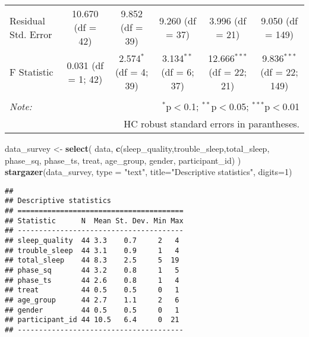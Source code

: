 \documentclass[
]{article}
\newenvironment{Shaded}{\begin{snugshade}}{\end{snugshade}}
\newcommand{\AttributeTok}[1]{\textcolor[rgb]{0.13,0.29,0.53}{#1}}
\newcommand{\DecValTok}[1]{\textcolor[rgb]{0.00,0.00,0.81}{#1}}
\newcommand{\FunctionTok}[1]{\textcolor[rgb]{0.13,0.29,0.53}{\textbf{#1}}}
\newcommand{\NormalTok}[1]{#1}
\newcommand{\OtherTok}[1]{\textcolor[rgb]{0.56,0.35,0.01}{#1}}
\newcommand{\StringTok}[1]{\textcolor[rgb]{0.31,0.60,0.02}{#1}}
\begin{document}
\begin{sidewaystable}[!htbp]
\begin{tabular}{@{\extracolsep{5pt}}lccccc}
Residual Std. Error & 10.670 (df = 42) & 9.852 (df = 39) & 9.260 (df = 37) & 3.996 (df = 21) & 9.050 (df = 149) \\ 
F Statistic & 0.031 (df = 1; 42) & 2.574$^{*}$ (df = 4; 39) & 3.134$^{**}$ (df = 6; 37) & 12.666$^{***}$ (df = 22; 21) & 9.836$^{***}$ (df = 22; 149) \\ 
\hline 
\hline \\[-1.8ex] 
\textit{Note:}  & \multicolumn{5}{r}{$^{*}$p$<$0.1; $^{**}$p$<$0.05; $^{***}$p$<$0.01} \\ 
 & \multicolumn{5}{r}{HC robust standard errors in parantheses.} \\ 
\end{tabular} 
\end{sidewaystable}

\begin{Shaded}
\begin{Highlighting}[]
\NormalTok{data\_survey }\OtherTok{\textless{}{-}} \FunctionTok{select}\NormalTok{(}
\NormalTok{  data, }\FunctionTok{c}\NormalTok{(}\StringTok{\textquotesingle{}sleep\_quality\textquotesingle{}}\NormalTok{,}\StringTok{\textquotesingle{}trouble\_sleep\textquotesingle{}}\NormalTok{,}\StringTok{\textquotesingle{}total\_sleep\textquotesingle{}}\NormalTok{, }
          \StringTok{\textquotesingle{}phase\_sq\textquotesingle{}}\NormalTok{, }\StringTok{\textquotesingle{}phase\_ts\textquotesingle{}}\NormalTok{, }\StringTok{\textquotesingle{}treat\textquotesingle{}}\NormalTok{, }\StringTok{\textquotesingle{}age\_group\textquotesingle{}}\NormalTok{, }\StringTok{\textquotesingle{}gender\textquotesingle{}}\NormalTok{, }\StringTok{\textquotesingle{}participant\_id\textquotesingle{}}\NormalTok{)}
\NormalTok{  )}
\FunctionTok{stargazer}\NormalTok{(data\_survey, }\AttributeTok{type =} \StringTok{"text"}\NormalTok{, }\AttributeTok{title=}\StringTok{"Descriptive statistics"}\NormalTok{, }\AttributeTok{digits=}\DecValTok{1}\NormalTok{)}
\end{Highlighting}
\end{Shaded}

\begin{verbatim}
## 
## Descriptive statistics
## =======================================
## Statistic      N  Mean St. Dev. Min Max
## ---------------------------------------
## sleep_quality  44 3.3    0.7     2   4 
## trouble_sleep  44 3.1    0.9     1   4 
## total_sleep    44 8.3    2.5     5  19 
## phase_sq       44 3.2    0.8     1   5 
## phase_ts       44 2.6    0.8     1   4 
## treat          44 0.5    0.5     0   1 
## age_group      44 2.7    1.1     2   6 
## gender         44 0.5    0.5     0   1 
## participant_id 44 10.5   6.4     0  21 
## ---------------------------------------
\end{verbatim}
\end{document}

